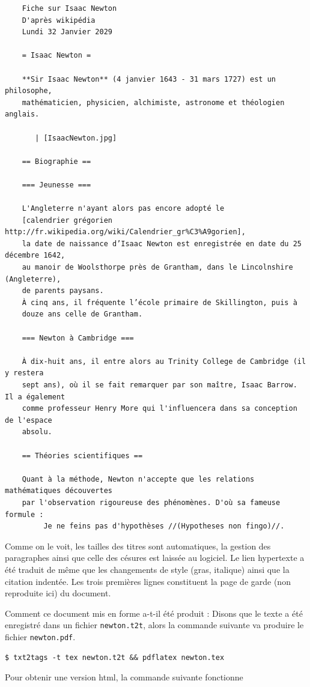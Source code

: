 \documentclass[]{article}
\begin{document}
\begin{verbatim}
    Fiche sur Isaac Newton 
    D'après wikipédia
    Lundi 32 Janvier 2029

    = Isaac Newton =

    **Sir Isaac Newton** (4 janvier 1643 - 31 mars 1727) est un philosophe,
    mathématicien, physicien, alchimiste, astronome et théologien anglais.

       | [IsaacNewton.jpg]

    == Biographie ==

    === Jeunesse ===

    L'Angleterre n'ayant alors pas encore adopté le 
    [calendrier grégorien http://fr.wikipedia.org/wiki/Calendrier_gr%C3%A9gorien],
    la date de naissance d’Isaac Newton est enregistrée en date du 25 décembre 1642,
    au manoir de Woolsthorpe près de Grantham, dans le Lincolnshire (Angleterre),
    de parents paysans. 
    À cinq ans, il fréquente l’école primaire de Skillington, puis à
    douze ans celle de Grantham.

    === Newton à Cambridge ===

    À dix-huit ans, il entre alors au Trinity College de Cambridge (il y restera
    sept ans), où il se fait remarquer par son maître, Isaac Barrow. Il a également
    comme professeur Henry More qui l'influencera dans sa conception de l'espace
    absolu.

    == Théories scientifiques ==

    Quant à la méthode, Newton n'accepte que les relations mathématiques découvertes
    par l'observation rigoureuse des phénomènes. D'où sa fameuse formule :
         Je ne feins pas d'hypothèses //(Hypotheses non fingo)//.
\end{verbatim}
Comme on le voit, les tailles des titres sont automatiques, la gestion
des paragraphes ainsi que celle des césures est laissée au logiciel. Le
lien hypertexte a été traduit de même que les changements de style
(gras, italique) ainsi que la citation indentée. Les trois premières
lignes constituent la page de garde (non reproduite ici) du document.

Comment ce document mis en forme a-t-il été produit : Disons que le
texte a été enregistré dans un fichier \texttt{newton.t2t}, alors la
commande suivante va produire le fichier \texttt{newton.pdf}.

\begin{verbatim}
$ txt2tags -t tex newton.t2t && pdflatex newton.tex
\end{verbatim}
Pour obtenir une version html, la commande suivante fonctionne
\end{document}
